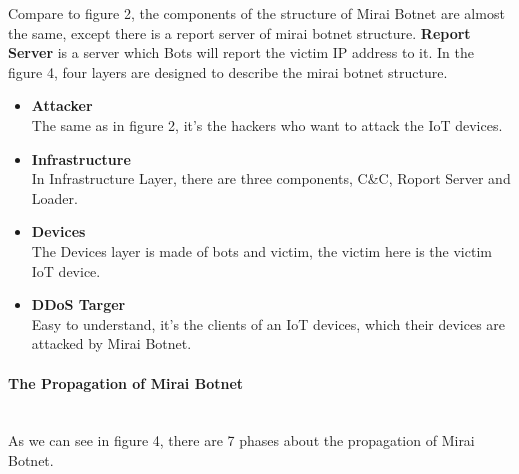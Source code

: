 \documentclass[conference]{IEEEtran}
\begin{document}
Compare to figure 2,  the components of the structure of  Mirai Botnet are almost the same, except there is a report server of mirai botnet structure.
\textbf{Report Server} is a server which Bots will report the victim IP address to it.
In the figure 4\cite{b1}, four layers are designed to describe the mirai botnet structure.

\begin{itemize}
\item{ \textbf{Attacker}}\\
The same as in figure 2, it's the hackers who want to attack the IoT devices.
\item{\textbf{Infrastructure}}\\
In Infrastructure Layer, there are three components, C\&C, Roport Server and Loader.
\item{\textbf{Devices}}\\
The Devices layer is made of bots and victim, the victim here is the victim IoT device.
\item{\textbf{DDoS Targer}}\\
Easy to understand, it's the clients of an IoT devices, which their devices are attacked by Mirai Botnet.

\end{itemize}
\paragraph{\textbf{The Propagation of Mirai Botnet}}\\
As we can see in figure 4, there are 7 phases about the propagation of Mirai Botnet.
\end{document}
